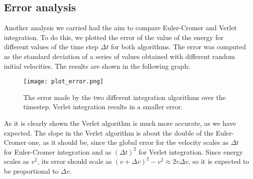 \documentclass[10pt,a4paper,titlepage]{article}
\begin{document}
\subsection*{Error analysis}
\noindent Another analysis we carried had the aim to compare Euler-Cromer and Verlet integration. To do this, we plotted the error of the value of the energy for different values of the time step $\Delta t$ for both algorithms. The error was computed as the standard deviation of a series of values obtained with different random initial velocities. The results are shown in the following graph:
\begin{figure}[H]
\begin{center}
\texttt{[image: plot\_error.png]}
\caption{The error made by the two different integration algorithms over the timestep. Verlet integration results in a smaller error.}
\end{center}
\end{figure}
\noindent As it is clearly shown the Verlet algorithm is much more accurate, as we have expected. The slope in the Verlet algorithm is about the double of the Euler-Cromer one, as it should be, since the global error for the velocity scales as $\Delta t$  for Euler-Cromer integration and as $(\Delta t)^2$ for Verlet integration. Since energy scales as $v^2$, its error should scale as $(v+\Delta v)^2 - v^2 \approx 2v\Delta v$, so it is expected to be proportional to $\Delta v$.
\end{document}
